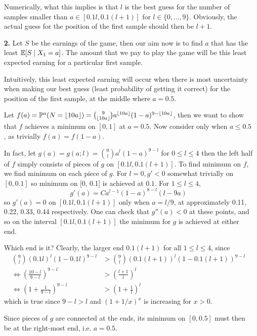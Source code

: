 \documentclass[a4paper, 10pt]{article}
\begin{document}
Numerically, what this implies is that $l$ is the best guess for the number of samples smaller than $ a \in [0.1l, 0.1(l+1)]$ for $l \in \{0, \dots, 9\}$. Obviously, the actual guess for the position of the first sample should then be $l + 1$.

\textbf{2.} Let $S$ be the earnings of the game, then our aim now is to find $a$ that has the least $\mathbb{E}[S \mid X_1 = a]$. The amount that we pay to play the game will be this least expected earning for a particular first sample.

Intuitively, this least expected earning will occur when there is most uncertainty when making our best guess (least probability of getting it correct) for the position of the first sample, at the middle where $a = 0.5$. 

Let $f(a) = \mathbb{P}^a(N = \lfloor10a\rfloor) = \binom{9}{\lfloor10a\rfloor}a^{\lfloor10a\rfloor} (1-a)^{9 - \lfloor10a\rfloor}$, then we want to show that $f$ achieves a minimum on $[0, 1]$ at $a = 0.5$. Now consider only when $a \leq 0.5$, as trivially $f(a) = f(1-a)$.

In fact, let $g(a) = g(a; l) = \binom{9}{l}a^{l} (1-a)^{9 - l}$ for $0 \leq l \leq 4$ then the left half of $f$ simply consists of pieces of $g$ on $[0.1l, 0.1(l+1)]$. To find minimum on $f$, we find minimum on each piece of $g$. For $l = 0, g' < 0$ somewhat trivially on $[0, 0.1]$ so minimum on [0, 0.1] is achieved at $0.1$. For $1 \leq l \leq 4$,
\[
g'(a) = Ca^{l-1} (1-a)^{8-l}(l - 9a)
\]
so $g'(a) = 0$ on $[0.1l, 0.1(l+1)]$ only when $a = l/9$, at approximately 0.11, 0.22, 0.33, 0.44 respectively.
One can check that $g''(a) < 0$ at these points, and so on the interval $[0.1l, 0.1(l+1)]$ the minimum for $g$ is achieved at either end.

Which end is it? Clearly, the larger end $0.1(l+1)$ for all $1 \leq l \leq 4$, since 
\begin{align*}
    \binom{9}{l} (0.1l)^l (1-0.1l)^{9-l} &> \binom{9}{l} (0.1(l+1))^l (1-0.1(l+1))^{9-l} \\
    \Leftrightarrow \left(\frac{10-l}{9-l}\right)^{9-l} &> \left(\frac{l+1}{l}\right)^l \\
    \Leftrightarrow \left(1 + \frac{1}{9-l}\right)^{9-l} &> \left(1 + \frac{1}{l}\right)^l
\end{align*}
which is true since $9 - l > l$ and $(1 + 1/x)^x$ is increasing for $x > 0$.

Since pieces of $g$ are connected at the ends, its minimum on $[0, 0.5]$ must then be at the right-most end, i.e. $a = 0.5$.
\end{document}
